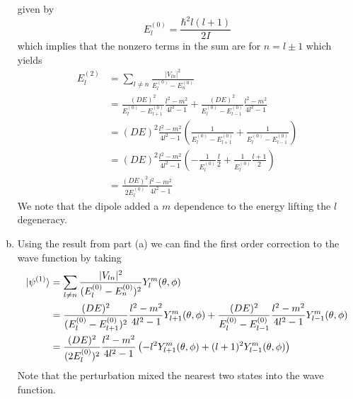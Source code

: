 \documentclass[11pt]{article}
\numberwithin{equation}{section}
\begin{document}
\begin{enumerate}[(a)]
given by
$$E_{l}^{(0)} = \frac{\hbar^2l(l+1)}{2I}$$ 
which implies that the nonzero terms in the sum are for $n=l\pm1$ which yields
\begin{align*}
E_{l}^{(2)} &= \sum_{l\ne{n}}\frac{|V_{ln}|^2}{E_{l}^{(0)}-E_{n}^{(0)}}\\
&= \frac{(DE)^2}{E_{l}^{(0)}-E_{l+1}^{(0)}}\frac{l^2-m^2}{4l^2-1} + \frac{(DE)^2}{E_{l}^{(0)}-E_{l-1}^{(0)}}\frac{l^2-m^2}{4l^2-1}\\
&= (DE)^2\frac{l^2-m^2}{4l^2-1}\left(\frac{1}{E_{l}^{(0)}-E_{l+1}^{(0)}}+\frac{1}{E_{l}^{(0)}-E_{l-1}^{(0)}}\right)\\
&= (DE)^2\frac{l^2-m^2}{4l^2-1}\left(-\frac{1}{E_{l}^{(0)}}\frac{l}{2}+\frac{1}{E_{l}^{(0)}}\frac{l+1}{2}\right)\\
&= \frac{(DE)^2}{2E_{l}^{(0)}}\frac{l^2-m^2}{4l^2-1}
\end{align*}
We note that the dipole added a $m$ dependence to the energy lifting the $l$ degeneracy.

\item Using the result from part (a) we can find the first order correction to the 
wave function by taking 
\begin{align*}
|{\psi^{(1)}}\rangle &= \sum_{l\ne{n}}\frac{|V_{ln}|^2}{(E_{l}^{(0)}-E_{n}^{(0)})^2}Y_{l}^{m}(\theta,\phi)\\
&= \frac{(DE)^2}{(E_{l}^{(0)}-E_{l+1}^{(0)})^2}\frac{l^2-m^2}{4l^2-1}Y_{l+1}^{m}(\theta,\phi) + \frac{(DE)^2}{E_{l}^{(0)}-E_{l-1}^{(0)}}\frac{l^2-m^2}{4l^2-1}Y_{l-1}^{m}(\theta,\phi)\\
&= \frac{(DE)^2}{(2E_{l}^{(0)})^2}\frac{l^2-m^2}{4l^2-1}\left(-l^2Y_{l+1}^{m}(\theta,\phi) + (l+1)^2Y_{l-1}^{m}(\theta,\phi)\right)
\end{align*}
Note that the perturbation mixed the nearest two states into the wave function.


\end{enumerate}

\pagebreak
\end{document}
